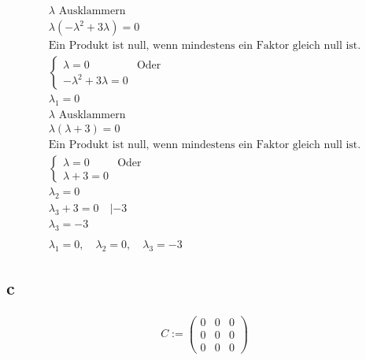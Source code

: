 \begin{align*}
    \text{$\lambda$ Ausklammern} \\
    \lambda (-\lambda^2 + 3\lambda) = 0 \\
    \text{Ein Produkt ist null, wenn mindestens ein Faktor gleich null ist.} \\
    \begin{cases}
        \lambda = 0 & \text{Oder} \\
        -\lambda^2 + 3 \lambda = 0
    \end{cases} \\
    \lambda_1 = 0 \\
    \text{$\lambda$ Ausklammern} \\
    \lambda(\lambda + 3) = 0 \\
    \text{Ein Produkt ist null, wenn mindestens ein Faktor gleich null ist.} \\
    \begin{cases}
        \lambda = 0 & \text{Oder} \\
        \lambda + 3 = 0
    \end{cases} \\
    \lambda_2 = 0 \\
    \lambda_3 + 3 = 0 \quad | -3 \\
    \lambda_3 = -3 \\\\
    \lambda_1 = 0, \quad \lambda_2 = 0, \quad \lambda_3 = -3
\end{align*}

\subsection{c}

\begin{align*}
    C := \begin{pmatrix}
        0 & 0 & 0 \\
        0 & 0 & 0 \\
        0 & 0 & 0
    \end{pmatrix}
\end{align*}

